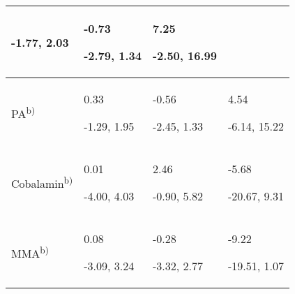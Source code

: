 \begin{flushleft}
\begin{supertabular}{m{2.4cm}m{3.5cm}m{3.5cm}m{3.2cm}}
 {}-1.77, 2.03 &
{ {}-0.73}

 {}-2.79, 1.34 &
{ 7.25}

 {}-2.50, 16.99\\\hline
 PA\textsuperscript{b)} &
{ 0.33}

 {}-1.29, 1.95 &
{ {}-0.56}

 {}-2.45, 1.33 &
{ 4.54}

 {}-6.14, 15.22\\\hline
 Cobalamin\textsuperscript{b)} &
{ 0.01}

 {}-4.00, 4.03 &
{ 2.46}

 {}-0.90, 5.82 &
{ {}-5.68}

 {}-20.67, 9.31\\\hline
 MMA\textsuperscript{b)} &
{ 0.08}

 {}-3.09, 3.24 &
{ {}-0.28}

 {}-3.32, 2.77 &
{ {}-9.22}

 {}-19.51, 1.07\\\hline
\end{supertabular}
\end{flushleft}



